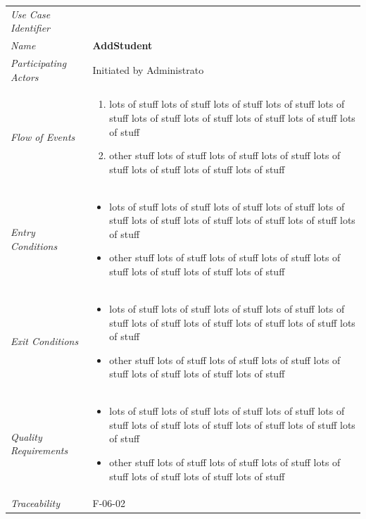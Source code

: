 \documentclass[12pt,letterpaper]{article}
\begin{document}
\begin{center}
	\begin{tabu} to 
		\toprule
		Use Case Identifier & \addstudent{} \\
		Name & {\bf AddStudent} \\
		Participating Actors & Initiated by Administrato \\
		Flow of Events & 
	    \begin{enumerate}[topsep=-1em]
		    \item lots of stuff lots of stuff lots of stuff lots of stuff lots of stuff lots of stuff lots of stuff lots of stuff lots of stuff lots of stuff
		    \item other stuff lots of stuff lots of stuff lots of stuff lots of stuff lots of stuff lots of stuff lots of stuff
		\end{enumerate} \\

		Entry Conditions &
		\begin{itemize}[topsep=-1em]
		    \item lots of stuff lots of stuff lots of stuff lots of stuff lots of stuff lots of stuff lots of stuff lots of stuff lots of stuff lots of stuff
		    \item other stuff lots of stuff lots of stuff lots of stuff lots of stuff lots of stuff lots of stuff lots of stuff
        \end{itemize} \\

		Exit Conditions &
		\begin{itemize}[topsep=-1em]
		    \item lots of stuff lots of stuff lots of stuff lots of stuff lots of stuff lots of stuff lots of stuff lots of stuff lots of stuff lots of stuff
		    \item other stuff lots of stuff lots of stuff lots of stuff lots of stuff lots of stuff lots of stuff lots of stuff
        \end{itemize} \\

		Quality Requirements &
		\begin{itemize}[topsep=-1em]
		    \item lots of stuff lots of stuff lots of stuff lots of stuff lots of stuff lots of stuff lots of stuff lots of stuff lots of stuff lots of stuff
		    \item other stuff lots of stuff lots of stuff lots of stuff lots of stuff lots of stuff lots of stuff lots of stuff
        \end{itemize} \\

		Traceability & F-06-02 \\
		\toprule
	\end{tabu}
\end{center}
\end{document}
